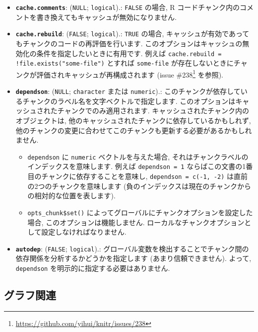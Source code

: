 \documentclass[
  11pt,
  lualatex,ja=standard,jafont=noto]{bxjsreport}
\providecommand{\tightlist}{%
  \setlength{\itemsep}{0pt}\setlength{\parskip}{0pt}}
\renewcommand{\href}[2]{#2\footnote{\url{#1}}}
\begin{document}
\begin{itemize}
\item
  \textbf{\texttt{cache.comments}}: (\texttt{NULL}; \texttt{logical}).: \texttt{FALSE} の場合, R コードチャンク内のコメントを書き換えてもキャッシュが無効になりません.
\item
  \textbf{\texttt{cache.rebuild}}: (\texttt{FALSE}; \texttt{logical}).: \texttt{TRUE} の場合, キャッシュが有効であってもチャンクのコードの再評価を行います. このオプションはキャッシュの無効化の条件を指定したいときに有用です. 例えば \texttt{cache.rebuild = !file.exists("some-file")} とすれば \texttt{some-file} が存在しないときにチャンクが評価されキャッシュが再構成されます (issue \href{https://github.com/yihui/knitr/issues/238}{\#238} を参照).
\item
  \textbf{\texttt{dependson}}: (\texttt{NULL}; \texttt{character} または \texttt{numeric}).: このチャンクが依存しているチャンクのラベル名を文字ベクトルで指定します. このオプションはキャッシュされたチャンクでのみ適用されます. キャッシュされたチャンク内のオブジェクトは, 他のキャッシュされたチャンクに依存しているかもしれず, 他のチャンクの変更に合わせてこのチャンクも更新する必要があるかもしれません.

  \begin{itemize}
  \tightlist
  \item
    \texttt{dependson} に \texttt{numeric} ベクトルを与えた場合, それはチャンクラベルのインデックスを意味します. 例えば \texttt{dependson = 1} ならばこの文書の1番目のチャンクに依存することを意味し, \texttt{dependson = c(-1, -2)} は直前の2つのチャンクを意味します (負のインデックスは現在のチャンクからの相対的な位置を表します).
  \item
    \texttt{opts\_chunk\$set()} によってグローバルにチャンクオプションを設定した場合, このオプションは機能しません. ローカルなチャンクオプションとして設定しなければなりません.
  \end{itemize}
\item
  \textbf{\texttt{autodep}}: (\texttt{FALSE}; \texttt{logical}).: グローバル変数を検出することでチャンク間の依存関係を分析するかどうかを指定します (あまり信頼できません). よって, \texttt{dependson} を明示的に指定する必要はありません.
\end{itemize}

\hypertarget{plots}{%
\subsection{グラフ関連}\label{plots}}
\end{document}
